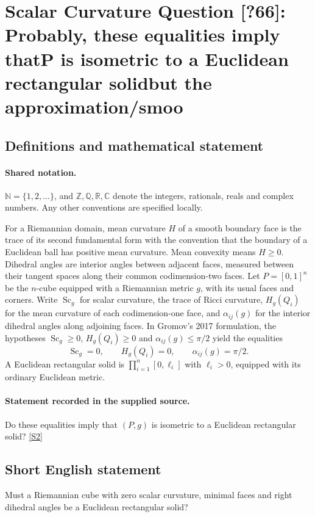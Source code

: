 \documentclass[11pt]{article}
\newcommand{\sref}[2]{\hyperlink{source:#1:#2}{[S#2]}}
\begin{document}
\section{Scalar Curvature Question [?66]: Probably, these equalities imply thatP is isometric to a Euclidean rectangular solidbut the approximation/smoo}\label{statement}

\subsection{Definitions and mathematical statement}

\paragraph{Shared notation.}$\mathbb N=\{1,2,\ldots\}$, and $\mathbb Z,\mathbb Q,\mathbb R,\mathbb C$ denote the integers, rationals, reals and complex numbers. Any other conventions are specified locally.


For a Riemannian domain, mean curvature $H$ of a smooth boundary face is the trace of its second fundamental form with the convention that the boundary of a Euclidean ball has positive mean curvature. Mean convexity means $H\geq0$. Dihedral angles are interior angles between adjacent faces, measured between their tangent spaces along their common codimension-two faces. Let $P=[0,1]^n$ be the $n$-cube equipped with a Riemannian metric $g$, with its usual faces and corners. Write $\operatorname{Sc}_g$ for scalar curvature, the trace of Ricci curvature, $H_g(Q_i)$ for the mean curvature of each codimension-one face, and $\alpha_{ij}(g)$ for the interior dihedral angles along adjoining faces. In Gromov's 2017 formulation, the hypotheses $\operatorname{Sc}_g\geq0$, $H_g(Q_i)\geq0$ and $\alpha_{ij}(g)\leq\pi/2$ yield the equalities
\[\operatorname{Sc}_g=0,\qquad H_g(Q_i)=0,\qquad\alpha_{ij}(g)=\pi/2.\]
A Euclidean rectangular solid is $\prod_{i=1}^n[0,\ell_i]$ with $\ell_i>0$, equipped with its ordinary Euclidean metric.
\paragraph{Statement recorded in the supplied source.}
Do these equalities imply that $(P,g)$ is isometric to a Euclidean rectangular solid? \sref{statement}{2}
\subsection{Short English statement}
Must a Riemannian cube with zero scalar curvature, minimal faces and right dihedral angles be a Euclidean rectangular solid?
\end{document}
